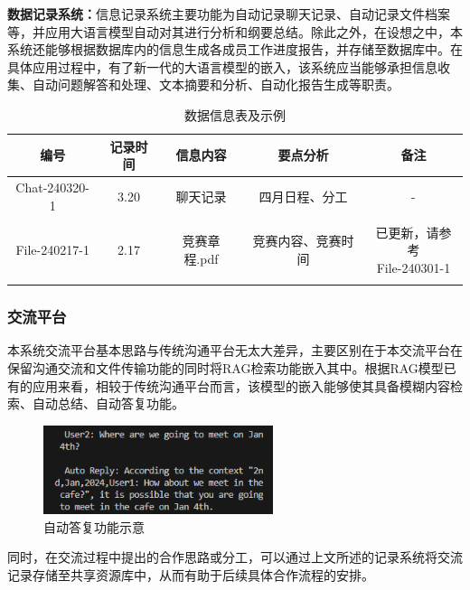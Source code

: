 \documentclass[zihao=-4]{ctexart}
\begin{document}
\begin{spacing}{1.5}
\textbf{数据记录系统：}信息记录系统主要功能为自动记录聊天记录、自动记录文件档案等，并应用大语言模型自动对其进行分析和纲要总结。除此之外，在设想之中，本系统还能够根据数据库内的信息生成各成员工作进度报告，并存储至数据库中。在具体应用过程中，有了新一代的大语言模型的嵌入，该系统应当能够承担信息收集、自动问题解答和处理、文本摘要和分析、自动化报告生成等职责\cite{7}。
\begin{table}[H]
\caption{数据信息表及示例}
\small
\centering
\begin{tabular}{ccccc}
\hline  
\textbf{编号} & \textbf{记录时间} & \textbf{信息内容} & \textbf{要点分析} & \textbf{备注} \\ 
\hline  
Chat-240320-1 & 3.20 & 聊天记录  & 四月日程、分工  & -\\
\\
File-240217-1&2.17&竞赛章程.pdf &竞赛内容、竞赛时间 & \makecell{已更新，请参考\\File-240301-1}\\
\hline
\label{b}
\end{tabular} 
\end{table}
 \subsubsection{交流平台 }本系统交流平台基本思路与传统沟通平台无太大差异，主要区别在于本交流平台在保留沟通交流和文件传输功能的同时将RAG检索功能嵌入其中。根据RAG模型已有的应用\cite{5}来看，相较于传统沟通平台而言，该模型的嵌入能够使其具备模糊内容检索、自动总结、自动答复功能。
\begin{figure}[H] %
    \centering %
    \includegraphics[width=0.6\textwidth]{自动答复示例.png} %
    \caption{自动答复功能示意} %
    \label{example_label} %
\end{figure}
同时，在交流过程中提出的合作思路或分工，可以通过上文所述的记录系统将交流记录存储至共享资源库中，从而有助于后续具体合作流程的安排。

\end{spacing}
\end{document}
